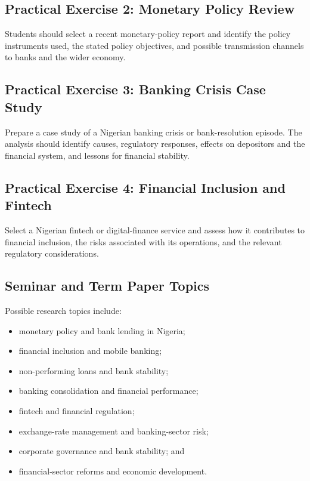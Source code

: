 \documentclass[
]{article}
\providecommand{\tightlist}{%
  \setlength{\itemsep}{0pt}\setlength{\parskip}{0pt}}
\begin{document}
\subsection{Practical Exercise 2: Monetary Policy Review}\label{practical-exercise-2-monetary-policy-review}

Students should select a recent monetary-policy report and identify the policy instruments used, the stated policy objectives, and possible transmission channels to banks and the wider economy.

\subsection{Practical Exercise 3: Banking Crisis Case Study}\label{practical-exercise-3-banking-crisis-case-study}

Prepare a case study of a Nigerian banking crisis or bank-resolution episode. The analysis should identify causes, regulatory responses, effects on depositors and the financial system, and lessons for financial stability.

\subsection{Practical Exercise 4: Financial Inclusion and Fintech}\label{practical-exercise-4-financial-inclusion-and-fintech}

Select a Nigerian fintech or digital-finance service and assess how it contributes to financial inclusion, the risks associated with its operations, and the relevant regulatory considerations.

\subsection{Seminar and Term Paper Topics}\label{seminar-and-term-paper-topics}

Possible research topics include:

\begin{itemize}
\tightlist
\item
  monetary policy and bank lending in Nigeria;
\item
  financial inclusion and mobile banking;
\item
  non-performing loans and bank stability;
\item
  banking consolidation and financial performance;
\item
  fintech and financial regulation;
\item
  exchange-rate management and banking-sector risk;
\item
  corporate governance and bank stability; and
\item
  financial-sector reforms and economic development.
\end{itemize}
\end{document}
